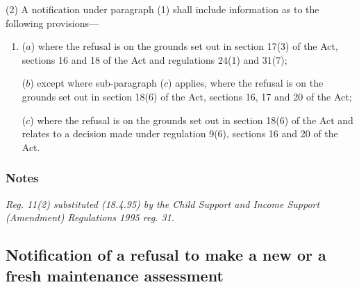 \documentclass[a4paper]{article}
\newcommand\amendment[1]{\subsubsection*{Notes}{\itshape\frenchspacing\footnotesize #1 \par}}
\begin{document}
(2) A notification under paragraph (1) shall include information as to the following provisions—
\begin{enumerate}\item[]
($a$) where the refusal is on the grounds set out in section 17(3) of the Act, sections 16 and 18 of the Act and regulations 24(1) and 31(7);

($b$) except where sub-paragraph ($c$) applies, where the refusal is on the grounds set out in section 18(6) of the Act, sections 16, 17 and 20 of the Act;

($c$) where the refusal is on the grounds set out in section 18(6) of the Act and relates to a decision made under regulation 9(6), sections 16 and 20 of the Act.
\end{enumerate}

\amendment{
Reg. 11(2) substituted (18.4.95) by the Child Support and Income Support (Amendment) Regulations 1995 reg. 31.
}

\subsection[12. Notification of a refusal to make a new or a fresh maintenance assessment]{Notification of a refusal to make a new or a fresh maintenance assessment}
\end{document}
